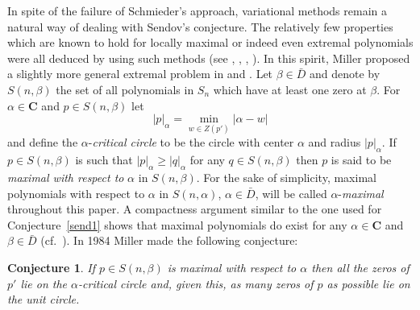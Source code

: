 \documentclass[10pt,twoside,a4paper,reqno]{amsart}
\theoremstyle{plain}
\newtheorem{conjecture}   {Conjecture}
\theoremstyle{definition}
\begin{document}
{In spite of the failure of Schmieder's approach, variational methods remain a 
natural way of dealing with 
Sendov's conjecture. The relatively few properties which are known to 
hold for locally 
maximal or indeed even extremal polynomials were all deduced by using such 
methods (see \cite{B}, \cite{M1}, \cite{M2}, \cite{SSz}). In this spirit,  
Miller proposed a slightly more general extremal problem in \cite{M1} and 
\cite{M2}. Let $\beta\in \bar{D}$ and denote by $S(n,\beta)$ the 
set of all polynomials in $S_{n}$ which have at least one zero at $\beta$. For 
$\alpha\in \mathbf{C}$ and $p\in S(n,\beta)$ let 
$$|p|_{\alpha}=\min_{w\in Z(p')}|\alpha-w|$$ 
and define the $\alpha$-{\em critical circle} to be the circle with center 
$\alpha$ and radius $|p|_{\alpha}$. If $p\in S(n,\beta)$ is such that 
$|p|_{\alpha}\ge |q|_{\alpha}$ for 
any $q\in S(n,\beta)$ then $p$ is said to be {\em maximal with respect to} 
$\alpha$ in $S(n,\beta)$. For the sake of simplicity, maximal polynomials 
with respect to $\alpha$ in 
$S(n,\alpha)$, $\alpha\in \bar{D}$, will be called $\alpha$-{\em maximal} 
throughout this paper. A compactness argument similar to the one used for 
Conjecture~\ref{send1} 
shows that maximal polynomials do exist for any $\alpha \in \mathbf{C}$ and 
$\beta\in \bar{D}$ (cf.~\cite[Proposition 2.3]{M1}). In 1984 Miller made the 
following conjecture:

\begin{conjecture}\label{miller}
If $p\in S(n,\beta)$ is maximal with respect to $\alpha$ then all the zeros 
of $p'$ lie on the $\alpha$-critical circle and, given this, as many zeros of 
$p$ as possible lie on the unit circle.
\end{conjecture}

}
\end{document}
